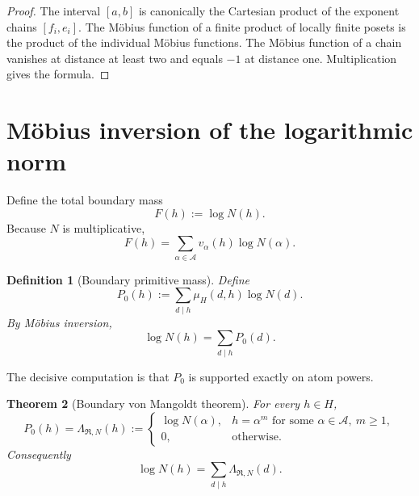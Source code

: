 \documentclass[11pt]{article}
\newtheorem{theorem}{Theorem}[section]
\newtheorem{definition}[theorem]{Definition}
\newcommand{\cA}{\mathcal A}
\newcommand{\cR}{\mathfrak R}
\begin{document}
\begin{proof}
The interval $[a,b]$ is canonically the Cartesian product of the exponent chains $[f_i,e_i]$. The M\"obius function of a finite product of locally finite posets is the product of the individual M\"obius functions. The M\"obius function of a chain vanishes at distance at least two and equals $-1$ at distance one. Multiplication gives the formula.
\end{proof}

\section{M\"obius inversion of the logarithmic norm}

Define the total boundary mass
\begin{equation}\label{eq:F}
F(h):=\log N(h).
\end{equation}
Because $N$ is multiplicative,
\begin{equation}\label{eq:additive}
F(h)=\sum_{\alpha\in\cA}v_\alpha(h)\log N(\alpha).
\end{equation}

\begin{definition}[Boundary primitive mass]
Define
\begin{equation}\label{eq:P0}
P_0(h):=\sum_{d\mid h}\mu_H(d,h)\log N(d).
\end{equation}
By M\"obius inversion,
\begin{equation}\label{eq:invert}
\log N(h)=\sum_{d\mid h}P_0(d).
\end{equation}
\end{definition}

The decisive computation is that $P_0$ is supported exactly on atom powers.

\begin{theorem}[Boundary von Mangoldt theorem]\label{thm:mangoldt}
For every $h\in H$,
\[
\boxed{
P_0(h)=\Lambda_{\cR,N}(h):=
\begin{cases}
\log N(\alpha),&h=\alpha^m\text{ for some }\alpha\in\cA,\ m\ge1,\\
0,&\text{otherwise}.
\end{cases}}
\]
Consequently
\begin{equation}\label{eq:abstractmangoldt}
\boxed{\log N(h)=\sum_{d\mid h}\Lambda_{\cR,N}(d).}
\end{equation}
\end{theorem}
\end{document}
